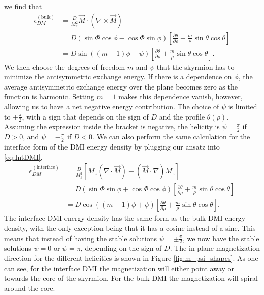 \documentclass[12pt, a4paper]{article}		%
\numberwithin{equation}{section}
\begin{document}
we find that
\begin{align}
\nonumber \epsilon_{DM}^{(\text{bulk})} &= \frac{D}{M_s^2} \vec{M}\cdot(\nabla\times\vec{M}) \\
\nonumber &= D\left(\sin\Phi\cos\phi-\cos\Phi\sin\phi\right)\left[\frac{\partial\theta}{\partial\rho}+\frac{m}{\rho}\sin\theta\cos\theta\right] \\
&= D\sin((m-1)\phi+\psi)\left[\frac{\partial\theta}{\partial\rho}+\frac{m}{\rho}\sin\theta\cos\theta\right].\label{eq:BulkDMIepsilon}
\end{align}
We then choose the degrees of freedom $m$ and $\psi$ that the skyrmion has to minimize the antisymmetric exchange energy. If there is a dependence on $\phi$, the average antisymmetric exchange energy over the plane becomes zero as the function is harmonic. Setting $m=1$ makes this dependence vanish, however, allowing us to have a net negative energy contribution. The choice of $\psi$ is limited to $\pm \frac{\pi}{2}$, with a sign that depends on the sign of $D$ and the profile $\theta(\rho)$. Assuming the expression inside the bracket is negative, the helicity is $\psi = \frac{\pi}{2}$ if $D>0$, and $\psi = -\frac{\pi}{2}$ if $D<0$. We can also perform the same calculation for the interface form of the DMI energy density by plugging our ansatz into \eqref{eq:IntDMI},
\begin{align}
\nonumber \epsilon_{DM}^{(\text{interface})} &= \frac{D}{M_s^2}\left[ M_z (\nabla\cdot\vec{M}) - (\vec{M}\cdot\nabla)M_z\right] \\
\nonumber &= D\left(\sin\Phi\sin\phi+\cos\Phi\cos\phi\right)\left[\frac{\partial\theta}{\partial\rho}+\frac{m}{\rho}\sin\theta\cos\theta\right] \\
&= D\cos((m-1)\phi+\psi)\left[\frac{\partial\theta}{\partial\rho}+\frac{m}{\rho}\sin\theta\cos\theta\right].\label{eq:IntDMIepsilon}
\end{align}
The interface DMI energy density has the same form as the bulk DMI energy density, with the only exception being that it has a cosine instead of a sine. This means that instead of having the stable solutions $\psi = \pm \frac{\pi}{2}$, we now have the stable solutions $\psi=0$ or $\psi=\pi$, depending on the sign of $D$. The in-plane magnetization direction for the different helicities is shown in Figure \ref{fig:m_psi_shapes}. As one can see, for the interface DMI the magnetization will either point away or towards the core of the skyrmion. For the bulk DMI the magnetization will spiral around the core.
\end{document}
